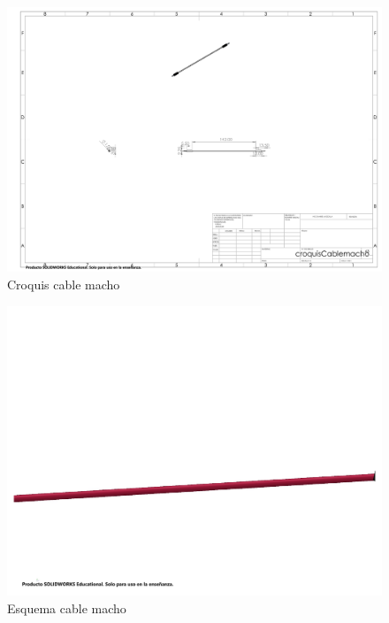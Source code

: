     \begin{figure}[H]
        \centering
        \includegraphics[trim = {1mm 1mm 1mm 1mm},clip,scale=0.2
        ]{25/img/croquisCablemacho.pdf}
        \caption{Croquis cable macho}
        \label{croquis:cable macho}
    \end{figure}
    \begin{figure}[H]
        \centering
        \includegraphics[trim = {10mm 10mm 10mm 10mm},clip,scale=0.2]{25/img/cableMacho.pdf}
        \caption{Esquema cable macho}
        \label{fig:cable macho}
    \end{figure}

